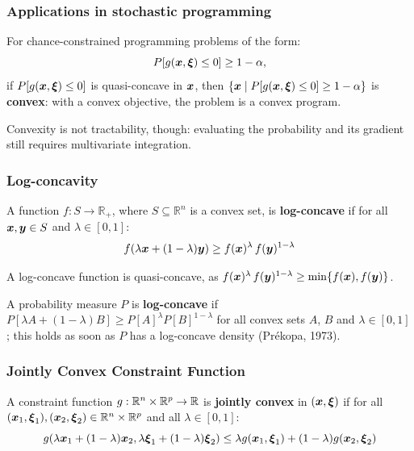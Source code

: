 \documentclass[aspectratio=169]{beamer}
\begin{document}
\begin{frame}
\frametitle{Applications in stochastic programming}

For chance-constrained programming problems of the form:
\[
P[g({\boldsymbol{x}},{\boldsymbol{\xi}}) \leq 0] \geq 1-\alpha,
\]
if $P[g({\boldsymbol{x}},{\boldsymbol{\xi}})\leq 0]$ is quasi-concave in ${\boldsymbol{x}}$, 
then $\{ {\boldsymbol{x}} \mid P[g({\boldsymbol{x}},{\boldsymbol{\xi}}) \leq 0] \geq 1-\alpha\}$ is \textbf{convex}: with a convex objective, the problem is a convex program.

\smallskip

Convexity is not tractability, though: evaluating the probability and its gradient still requires multivariate integration.

\end{frame}

\begin{frame}
\frametitle{Log-concavity}

\begin{definition}
	A function $f: S \to \mathbb{R}_+$, where $S \subseteq \mathbb{R}^n$ is a convex set, is \textbf{log-concave} if for all ${\boldsymbol{x}}, {\boldsymbol{y}} \in S$ and $\lambda \in [0,1]$:
	\[
	f(\lambda {\boldsymbol{x}} + (1-\lambda){\boldsymbol{y}}) \geq f({\boldsymbol{x}})^\lambda \, f({\boldsymbol{y}})^{1-\lambda}
	\]
\end{definition}

A log-concave function is quasi-concave, as $f({\boldsymbol{x}})^\lambda \, f({\boldsymbol{y}})^{1-\lambda} \geq \min\{f({\boldsymbol{x}}), f({\boldsymbol{y}})\}$.

\smallskip

A probability measure $P$ is \textbf{log-concave} if $P[\lambda A + (1-\lambda) B] \geq P[A]^{\lambda} P[B]^{1-\lambda}$ for all convex sets $A$, $B$ and $\lambda \in [0,1]$; this holds as soon as $P$ has a log-concave density (Prékopa, 1973).

\end{frame}

\begin{frame}
	\frametitle{Jointly Convex Constraint Function}

\begin{definition}
	A constraint function $g: {\mathbb{R}}^n \times {\mathbb{R}}^p \to {\mathbb{R}}$ is \textbf{jointly convex} in $({\boldsymbol{x}}, {\boldsymbol{\xi}})$ if for all $({\boldsymbol{x}}_1, {\boldsymbol{\xi}}_1), ({\boldsymbol{x}}_2, {\boldsymbol{\xi}}_2) \in {\mathbb{R}}^n \times {\mathbb{R}}^p$ and all $\lambda \in [0,1]$:
	\[
	g(\lambda {\boldsymbol{x}}_1 + (1-\lambda){\boldsymbol{x}}_2, \lambda {\boldsymbol{\xi}}_1 + (1-\lambda){\boldsymbol{\xi}}_2) \leq \lambda g({\boldsymbol{x}}_1, {\boldsymbol{\xi}}_1) + (1-\lambda) g({\boldsymbol{x}}_2, {\boldsymbol{\xi}}_2)
	\]
\end{definition}

\end{frame}
\end{document}
